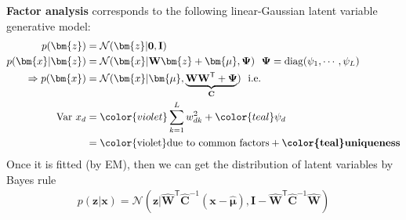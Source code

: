 \textbf{Factor analysis} corresponds to the following linear-Gaussian latent variable generative model:
\begin{align}
    p(\bm{z}) 
    & = \mathcal{N}(\bm{z}|\mathbf{0},\mathbf{I}) \\
    p(\bm{x}|\bm{z})
    & = \mathcal{N}(\bm{x}|\mathbf{W}\bm{z}+\bm{\mu},\mathbf{\Psi}) ~~ \mathbf{\Psi}=\mathrm{diag}(\psi_1,\cdots,\psi_L) \\
    \Rightarrow p(\bm{x}) & = \mathcal{N}(\bm{x}|\bm{\mu},\underbrace{\mathbf{WW}^\mathsf{T}+\mathbf{\Psi}}_{\mathbf{C}}) ~~ \text{i.e.} \\
    \mathrm{Var}~x_d & = {\color{violet}\sum_{k=1}^L w_{dk}^2} + {\color{teal}\psi_d} \\
    & = \text{\color{violet}due to common factors} + \textbf{\color{teal}uniqueness}
\end{align}
Once it is fitted (by EM), then we can get the distribution of latent variables by Bayes rule 
\begin{gather}
    \boxed{p(\bm{z}|\bm{x}) = \mathcal{N}(\bm{z}|\hat{\mathbf{W}}^\mathsf{T}\hat{\mathbf{C}}^{-1}(\bm{x}-\hat{\bm{\mu}}),\mathbf{I}-\hat{\mathbf{W}}^\mathsf{T}\hat{\mathbf{C}}^{-1}\hat{\mathbf{W}})} \label{eq:faposterior}
\end{gather}

